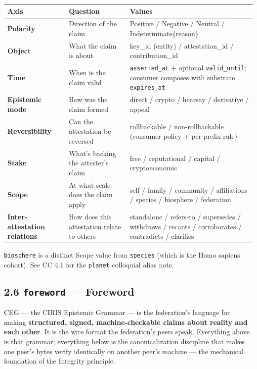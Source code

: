 \documentclass[11pt]{article}
\begin{document}
{\footnotesize
\begin{longtable}{|p{5.33cm}|p{5.33cm}|p{5.33cm}|}\hline
\textbf{Axis} & \textbf{Question} & \textbf{Values} \\ \hline\endhead
\textbf{Polarity} & Direction of the claim & Positive / Negative / Neutral / Indeterminate\{reason\} \\ \hline
\textbf{Object} & What the claim is about & key\_id (entity) / attestation\_id / contribution\_id \\ \hline
\textbf{Time} & When is the claim valid & \texttt{asserted\_at} + optional \texttt{valid\_until}; consumer composes with substrate \texttt{expires\_at} \\ \hline
\textbf{Epistemic mode} & How was the claim formed & direct / crypto / hearsay / derivative / appeal \\ \hline
\textbf{Reversibility} & Can the attestation be reversed & rollbackable / non-rollbackable (consumer policy + per-prefix rule) \\ \hline
\textbf{Stake} & What's backing the attester's claim & free / reputational / capital / cryptoeconomic \\ \hline
\textbf{Scope} & At what scale does the claim apply & self / family / community / affiliations / species / biosphere / federation \\ \hline
\textbf{Inter-attestation relations} & How does this attestation relate to others & standalone / refers-to / supersedes / withdraws / recants / corroborates / contradicts / clarifies \\ \hline
\end{longtable}}


\texttt{biosphere} is a distinct Scope value from \texttt{species} (which is the Homo sapiens cohort). See CC 4.1 for the \texttt{planet} colloquial alias note.


\subsection*{2.6 \texttt{foreword} — Foreword}


CEG — the CIRIS Epistemic Grammar — is the federation's language for making \textbf{structured, signed, machine-checkable claims about reality and each other}. It is the wire format the federation's peers speak. Everything above is that grammar; everything below is the canonicalization discipline that makes one peer's bytes verify identically on another peer's machine — the mechanical foundation of the Integrity principle.
\end{document}
